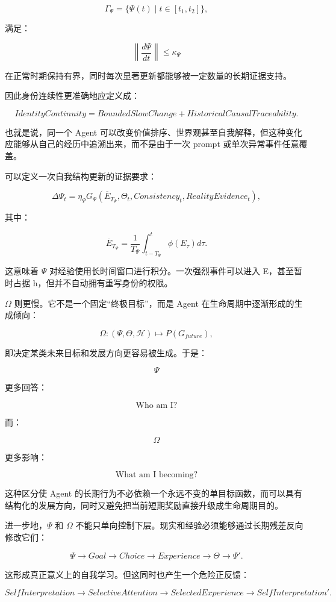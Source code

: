\[
\Gamma_\Psi
=
\{\Psi(t)\mid t\in[t_1,t_2]\},
\]

满足：

\[
\left\|
\frac{d\Psi}{dt}
\right\|
\leq
\kappa_\Psi
\]

在正常时期保持有界，同时每次显著更新都能够被一定数量的长期证据支持。

因此身份连续性更准确地应定义成：

\[
\boxed{
IdentityContinuity
=
BoundedSlowChange
+
HistoricalCausalTraceability.
}
\]

也就是说，同一个 Agent 可以改变价值排序、世界观甚至自我解释，但这种变化应能够从自己的经历中追溯出来，而不是由于一次 prompt 或单次异常事件任意覆盖。

可以定义一次自我结构更新的证据要求：

\[
\Delta\Psi_t
=
\eta_\Psi
G_\Psi
\left(
\overline{E}_{T_\Psi},
\Theta_t,
Consistency_t,
RealityEvidence_t
\right),
\]

其中：

\[
\overline{E}_{T_\Psi}
=
\frac{1}{T_\Psi}
\int_{t-T_\Psi}^{t}
\phi(E_\tau)d\tau.
\]

这意味着 $\Psi$ 对经验使用长时间窗口进行积分。一次强烈事件可以进入 E，甚至暂时占据 h，但并不自动拥有重写身份的权限。

$\Omega$ 则更慢。它不是一个固定“终极目标”，而是 Agent 在生命周期中逐渐形成的生成倾向：

\[
\Omega
:
(\Psi,\Theta,\mathcal{H})
\mapsto
P(G_{future}),
\]

即决定某类未来目标和发展方向更容易被生成。于是：

\[
\Psi
\]

更多回答：

\[
\text{Who am I?}
\]

而：

\[
\Omega
\]

更多影响：

\[
\text{What am I becoming?}
\]

这种区分使 Agent 的长期行为不必依赖一个永远不变的单目标函数，而可以具有结构化的发展方向，同时又避免把当前短期奖励直接升级成生命周期目的。

进一步地，$\Psi$ 和 $\Omega$ 不能只单向控制下层。现实和经验必须能够通过长期残差反向修改它们：

\[
\Psi
\rightarrow
Goal
\rightarrow
Choice
\rightarrow
Experience
\rightarrow
\Theta
\rightarrow
\Psi'.
\]

这形成真正意义上的自我学习。但这同时也产生一个危险正反馈：

\[
SelfInterpretation
\rightarrow
SelectiveAttention
\rightarrow
SelectedExperience
\rightarrow
SelfInterpretation'.
\]

